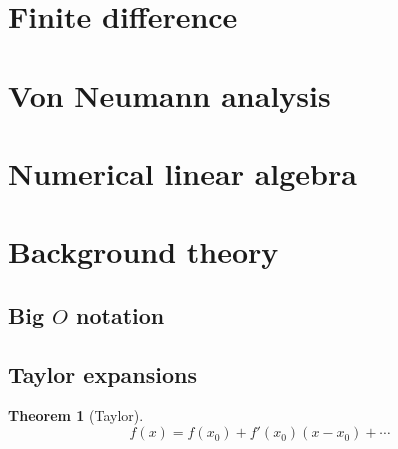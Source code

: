 \documentclass[11pt, a4paper]{article}
\theoremstyle{break}
\newtheorem{thm}{Theorem}[section]
\begin{document}
\section{Finite difference}


\section{Von Neumann analysis}


\section{Numerical linear algebra}\label{sec:numla}


\appendix
\section{Background theory}
\subsection{\texorpdfstring{Big $O$}{Big O} notation}\label{sec:bigO}
\subsection{Taylor expansions}\label{sec:taylor}
\begin{thm}[Taylor]\label{thm:taylor}
	\[f(x)=f(x_0)+f'(x_0)(x-x_0) + \cdots\]
\end{thm}

\nocite{*}



\label{lastpage}
\end{document}

